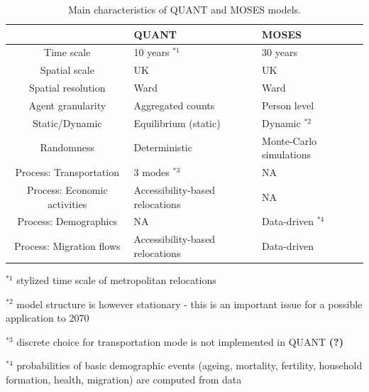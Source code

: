 \begin{table}
\begin{threeparttable}
	\caption{Main characteristics of QUANT and MOSES models.}\label{tab:comparison}
	\centering
	\begin{tabular}{|c|p{6cm}|p{6cm}|}
	\toprule
	& QUANT & MOSES \\
	\midrule
Time scale & 10 years $^{\ast 1}$ & 30 years \\
Spatial scale & UK & UK \\
Spatial resolution & Ward & Ward \\
Agent granularity & Aggregated counts & Person level \\
Static/Dynamic & Equilibrium (static) & Dynamic $^{\ast 2}$ \\
Randomness & Deterministic & Monte-Carlo simulations \\
Process: Transportation & 3 modes $^{\ast 3}$ & NA \\
Process: Economic activities & Accessibility-based relocations & NA \\
Process: Demographics & NA & Data-driven $^{\ast 4}$ \\
Process: Migration flows & Accessibility-based relocations & Data-driven \\
\bottomrule
	\end{tabular}
	\begin{tablenotes}
      \small
      \item $^{\ast 1}$ stylized time scale of metropolitan relocations \cite{wegener2004land}
      \item $^{\ast 2}$ model structure is however stationary - this is an important issue for a possible application to 2070
      \item $^{\ast 3}$ discrete choice for transportation mode is not implemented in QUANT \textbf{(?)} 
      \item $^{\ast 4}$ probabilities of basic demographic events (ageing, mortality, fertility, household formation, health, migration) are computed from data
    \end{tablenotes}
	\end{threeparttable}
\end{table}



